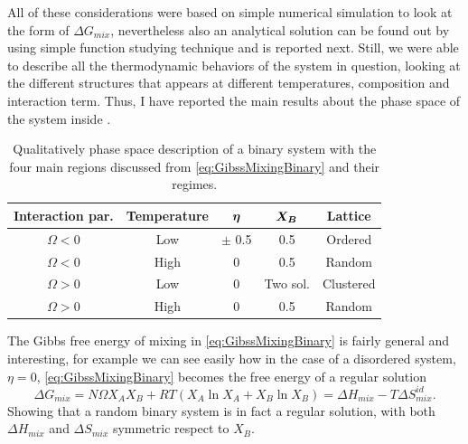 All of these considerations were based on simple numerical simulation to look at the form of $\Delta G_{mix}$, nevertheless also an analytical solution can be found out by using simple function studying technique and is reported next. Still, we were able to describe all the thermodynamic behaviors of the system in question, looking at the different structures that appears at different temperatures, composition and interaction term. Thus, I have reported the main results about the phase space of the system inside .

\begin{table}[t]
    \centering
    \caption
    {
        Qualitatively phase space description of a binary system with the four main regions discussed from \eqref{eq:GibssMixingBinary} and their regimes.
    }
    \label{tab:phaseBinary}
    \begin{tabular}{ccccc}
        \toprule
        \toprule
        \textbf{Interaction par.} & \textbf{Temperature} & $\vb*{\eta}$ & $\vb*{X_B}$ & \textbf{Lattice}\\
        \midrule
        $\Omega < 0$ & Low & $\pm$ 0.5 & 0.5 & Ordered\\
        $\Omega < 0$ & High & 0 & 0.5 & Random\\
        $\Omega > 0$ & Low & 0 & Two sol. & Clustered\\
        $\Omega > 0$ & High & 0 & 0.5 & Random\\
        \bottomrule
        \bottomrule
    \end{tabular}
\end{table}


\nt
{
    The Gibbs free energy of mixing in \eqref{eq:GibssMixingBinary} is fairly general and interesting, for example we can see easily how in the case of a disordered system, $\eta = 0$, \eqref{eq:GibssMixingBinary} becomes the free energy of a regular solution
    \begin{equation}
        \Delta G_{mix} = N\Omega X_AX_B + RT\left( X_A \ln X_A + X_B\ln X_B \right) = \Delta H_{mix} - T\Delta S_{mix}^{id}.
    \end{equation}
    Showing that a random binary system is in fact a regular solution, with both $\Delta H_{mix}$ and $\Delta S_{mix}$ symmetric respect to $X_B$.
}

